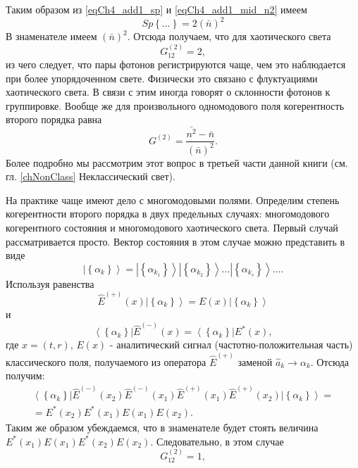 Таким образом из \eqref{eqCh4_add1_sp} и \eqref{eqCh4_add1_mid_n2} имеем
\[
Sp\left\{\dots\right\} = 2\left(\bar{n}\right)^2
\] 
В знаменателе имеем  $\left(\bar{n}\right)^2$. Отсюда получаем, что
для хаотического света 
\begin{equation}
G_{12}^{(2)} = 2,
\label{eqCh4_27}
\end{equation}
из чего следует, что пары фотонов регистрируются чаще, чем это
наблюдается при более упорядоченном свете. Физически это
связано с флуктуациями хаотического света. В связи с этим
иногда говорят о склонности фотонов к группировке. Вообще же
для произвольного одномодового поля когерентность второго
порядка равна 
\begin{equation}
G^{(2)} = \frac{\bar{n^2} - \bar{n}}{\left(\bar{n}\right)^2}.
\label{eqCh4_28}
\end{equation}
Более подробно мы рассмотрим этот вопрос в третьей части данной книги
(см. гл. \ref{chNonClass} Неклассический свет).

На практике чаще имеют дело с многомодовыми полями. Определим степень
когерентности второго порядка в двух предельных случаях:
многомодового когерентного состояния и многомодового
хаотического света. Первый случай рассматривается
просто. Вектор состояния в этом случае можно представить в
виде  
\begin{equation}
\left|\left\{\alpha_k\right\}\right> = 
\left|\left\{\alpha_{k_1}\right\}\right>
\left|\left\{\alpha_{k_2}\right\}\right>
\dotsc
\left|\left\{\alpha_{k_s}\right\}\right>
\dots.
\label{eqCh4_29}
\end{equation}
Используя равенства 
\[
\hat{E}^{(+)}\left(x\right)\left|\left\{\alpha_k\right\}\right> = 
E\left(x\right)\left|\left\{\alpha_k\right\}\right>
\]
и
\[
\left<\left\{\alpha_k\right\}\right|\hat{E}^{(-)}\left(x\right) = 
\left<\left\{\alpha_k\right\}\right|E^{*}\left(x\right),
\]
где $x = \left(t, r\right)$, $E\left(x\right)$ - аналитический сигнал
(частотно-положительная часть) классического поля, получаемого из
оператора $\hat{E}^{(+)}$ заменой $\hat{a}_k \rightarrow
\alpha_k$. Отсюда получим:
\begin{eqnarray}
\left<\left\{\alpha_k\right\}\right|\hat{E}^{(-)}\left(x_2\right)
\hat{E}^{(-)}\left(x_1\right)\hat{E}^{(+)}\left(x_1\right)
\hat{E}^{(+)}\left(x_2\right)\left|\left\{\alpha_k\right\}\right> = 
\nonumber \\
= E^{*}\left(x_2\right)E^{*}\left(x_1\right)
E\left(x_1\right)E\left(x_2\right).
\nonumber
\end{eqnarray}
Таким же образом убеждаемся, что в знаменателе будет стоять величина  
$E^{*}\left(x_1\right)E\left(x_1\right)
E^{*}\left(x_2\right)
E\left(x_2\right)$. Следовательно, в этом случае
\begin{equation}
G_{12}^{(2)} = 1,
\label{eqCh4_30}
\end{equation}

